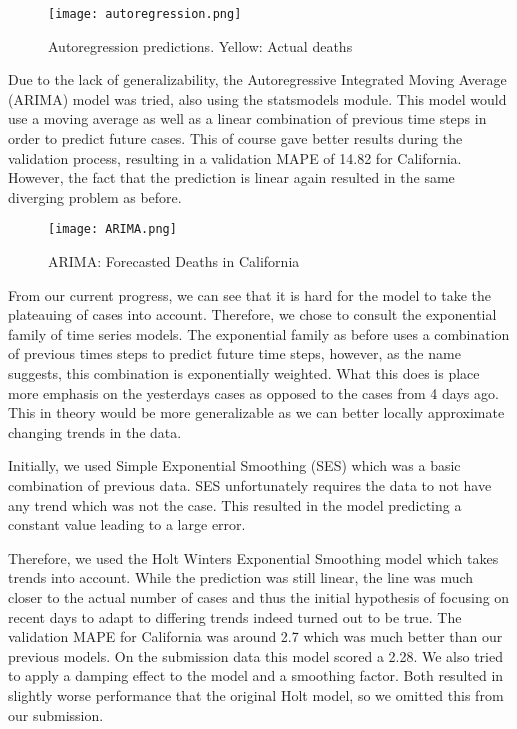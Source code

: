 \documentclass[sigconf]{acmart}
\begin{document}
\begin{figure}
  \centering
  \texttt{[image: autoregression.png]}
  \caption{Autoregression predictions. Yellow: Actual deaths}
\end{figure}

Due to the lack of generalizability, the Autoregressive Integrated Moving Average (ARIMA) model was tried, also using the statsmodels module. This model would use a moving average as well as a linear combination of previous time steps in order to predict future cases. This of course gave better results during the validation process, resulting in a validation MAPE of 14.82 for California. However, the fact that the prediction is linear again resulted in the same diverging problem as before.

\begin{figure}
  \centering
  \texttt{[image: ARIMA.png]}
  \caption{ARIMA: Forecasted Deaths in California}
\end{figure}

From our current progress, we can see that it is hard for the model to take the plateauing of cases into account. Therefore, we chose to consult the exponential family of time series models. The exponential family as before uses a combination of previous times steps to predict future time steps, however, as the name suggests, this combination is exponentially weighted. What this does is place more emphasis on the yesterdays cases as opposed to the cases from 4 days ago. This in theory would be more generalizable as we can better locally approximate changing trends in the data. 

Initially, we used Simple Exponential Smoothing (SES) which was a basic combination of previous data. SES unfortunately requires the data to not have any trend which was not the case. This resulted in the model predicting a constant value leading to a large error. 

Therefore, we used the Holt Winters Exponential Smoothing model which takes trends into account. While the prediction was still linear, the line was much closer to the actual number of cases and thus the initial hypothesis of focusing on recent days to adapt to differing trends indeed turned out to be true. The validation MAPE for California was around 2.7 which was much better than our previous models. On the submission data this model scored a 2.28. We also tried to apply a damping effect to the model and a smoothing factor. Both resulted in slightly worse performance that the original Holt model, so we omitted this from our submission.
\end{document}
